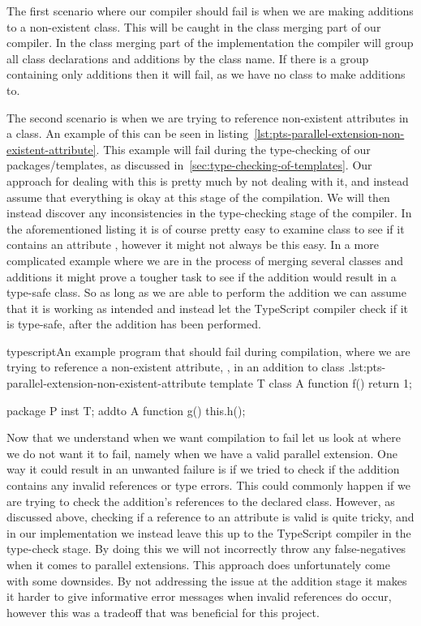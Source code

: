 The first scenario where our compiler should fail is when we are making additions to a non-existent class.
This will be caught in the class merging part of our compiler.
In the class merging part of the implementation the compiler will group all class declarations and additions by the class name.
If there is a group containing only additions then it will fail, as we have no class to make additions to.

The second scenario is when we are trying to reference non-existent attributes in a class.
An example of this can be seen in listing~\vref{lst:pts-parallel-extension-non-existent-attribute}.
This example will fail during the type-checking of our packages/templates, as discussed in~\vref{sec:type-checking-of-templates}.
Our approach for dealing with this is pretty much by not dealing with it, and instead assume that everything is okay at this stage of the compilation.
We will then instead discover any inconsistencies in the type-checking stage of the compiler.
In the aforementioned listing it is of course pretty easy to examine class  to see if it contains an attribute , however it might not always be this easy.
In a more complicated example where we are in the process of merging several classes and additions it might prove a tougher task to see if the addition would result in a type-safe class.
So as long as we are able to perform the addition we can assume that it is working as intended and instead let the TypeScript compiler check if it is type-safe, after the addition has been performed.

\begin{code}{typescript}{An example program that should fail during compilation, where we are trying to reference a non-existent attribute, , in an addition to class .}{lst:pts-parallel-extension-non-existent-attribute}
    template T {
        class A {
            function f() {
                return 1;
            }
        }
    }

    package P {
        inst T;
        addto A {
            function g() {
                this.h();
            }
        }
    }
\end{code}

Now that we understand when we want compilation to fail let us look at where we do not want it to fail, namely when we have a valid parallel extension.
One way it could result in an unwanted failure is if we tried to check if the addition contains any invalid references or type errors.
This could commonly happen if we are trying to check the addition's references to the declared class.
However, as discussed above, checking if a reference to an attribute is valid is quite tricky, and in our implementation we instead leave this up to the TypeScript compiler in the type-check stage.
By doing this we will not incorrectly throw any false-negatives when it comes to parallel extensions.
This approach does unfortunately come with some downsides.
By not addressing the issue at the addition stage it makes it harder to give informative error messages when invalid references do occur, however this was a tradeoff that was beneficial for this project.

